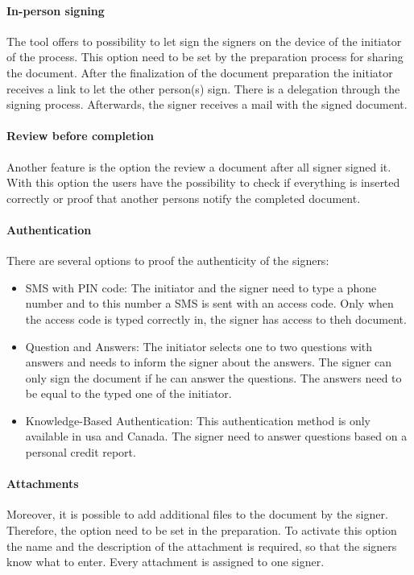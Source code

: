 \paragraph{In-person signing}
The tool offers to possibility to let sign the signers on the device of the initiator of the process. This option need to be set by the preparation process for sharing the document. After the finalization of the document preparation the initiator receives a link to let the other person(s) sign. There is a delegation through the signing process. Afterwards, the signer receives a mail with the signed document.

\paragraph{Review before completion}
Another feature is the option the review a document after all signer signed it. With this option the users have the possibility to check if everything is inserted correctly or proof that another persons notify the completed document. 

\paragraph{Authentication}
There are several options to proof the authenticity of the signers:
\begin{itemize}
	\item SMS with PIN code: The initiator and the signer need to type a phone number and to this number a SMS is sent with an access code. Only when the access code is typed correctly in, the signer has access to theh document.
	\item Question and Answers: The initiator selects one to two questions with answers and needs to inform the signer about the answers. The signer can only sign the document if he can answer the questions. The answers need to be equal to the typed one of the initiator.
	\item Knowledge-Based Authentication: This authentication method is only available in \gls{usa} and Canada. The signer need to answer questions based on a personal credit report.
\end{itemize}

\paragraph{Attachments}
Moreover, it is possible to add additional files to the document by the signer. Therefore, the option need to be set in the preparation. To activate this option the name and the description of the attachment is required, so that the signers know what to enter. Every attachment is assigned to one signer.

